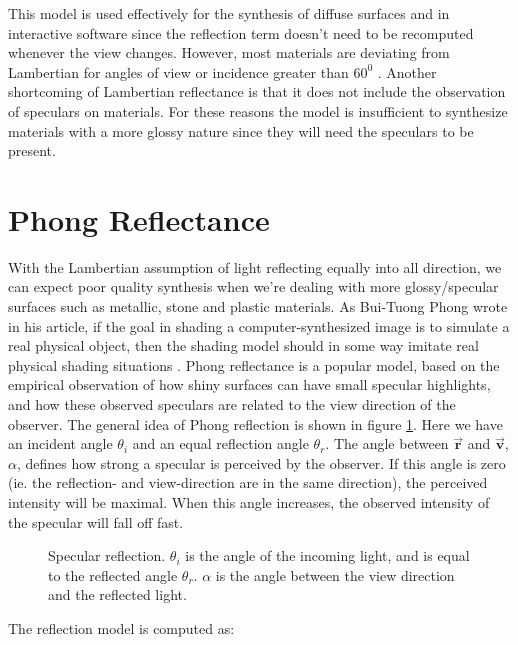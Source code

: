 This model is used effectively for the synthesis of diffuse surfaces and in interactive software since the reflection term doesn't need to be recomputed whenever the view changes. However, most materials are deviating from Lambertian for angles of view or incidence greater than $60^0$ \cite{DigitalModeling}. Another shortcoming of Lambertian reflectance is that it does not include the observation of speculars on materials. For these reasons the model is insufficient to synthesize materials with a more glossy nature since they will need the speculars to be present. 

	\section{Phong Reflectance}\label{sec:Phong}
		With the Lambertian assumption of light reflecting equally into all direction, we can expect poor quality synthesis when we're dealing with more glossy/specular surfaces such as metallic, stone and plastic materials. As Bui-Tuong Phong wrote in his article, if the goal in shading a computer-synthesized image is to simulate a real physical object, then the shading model should in some way imitate real physical shading situations \cite{Phong}. Phong reflectance is a popular model, based on the empirical observation of how shiny surfaces can have small specular highlights, and how these observed speculars are related to the view direction of the observer.
The general idea of Phong reflection is shown in figure \ref{fig:SPECULAR1}. Here we have an incident angle $\theta_i$ and an equal reflection angle $\theta_r$. The angle between $\vec{\mathbf{r}}$ and $\vec{\mathbf{v}}$, $\alpha$, defines how strong a specular is perceived by the observer. If this angle is zero (ie. the reflection- and view-direction are in the same direction), the perceived intensity will be maximal. When this angle increases, the observed intensity of the specular will fall off fast.

\begin{figure}[H]
	\begin{center}
	\end{center}
	\caption{Specular reflection. $\theta_i$ is the angle of the incoming light, and is equal to the reflected angle $\theta_r$. $\alpha$ is the angle between the view direction and the reflected light.}
	\label{fig:SPECULAR1}
\end{figure}


\noindent The reflection model is computed as:

